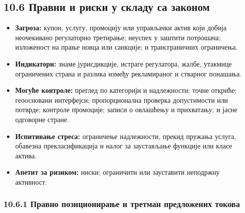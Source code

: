 \documentclass[11pt]{article}
\begin{document}
\subsection*{10.6 Правни и риски у складу са законом}

\begin{itemize}[leftmargin=*]
\item \textbf{Загроза:} купон, услугу, промоцију или управљачки актив који добија неочекивано регулаторно третирање; неуспех у заштити потрошача; изложеност на прање новца или санкције; и трансграничних ограничења.
\item \textbf{Индикатори:} знаме јурисдикције, истраге регулатора, жалбе, утакмице ограничених страна и разлика између рекламираног и стварног понашања.
\item \textbf{Могуће контроле:} преглед по категорији и надлежности; точне откриће; геоосновани интерфејси; пропорционална проверка допустимости или потврде; контроле промоције; записи о овлашћењу и прихватању; и јасне одговорне стране.
\item \textbf{Испитивање стреса:} ограничење надлежности, прекид пружања услуга, обавезна прекласификација и налог за заустављање функције или класе актива.
\item \textbf{Апетит за ризиком:} ниски; ограничити или зауставити неподржну активност.
\end{itemize}
\subsubsection*{10.6.1 Правно позиционирање и третман предложених токова}
\end{document}
